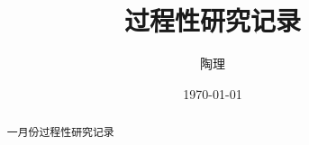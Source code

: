 \documentclass[lang=cn]{elegantpaper}
\title{过程性研究记录}
\date{\today}
\author{陶理}
\begin{document}
\maketitle
\begin{abstract}
    一月份过程性研究记录
\end{abstract}
\end{document}
